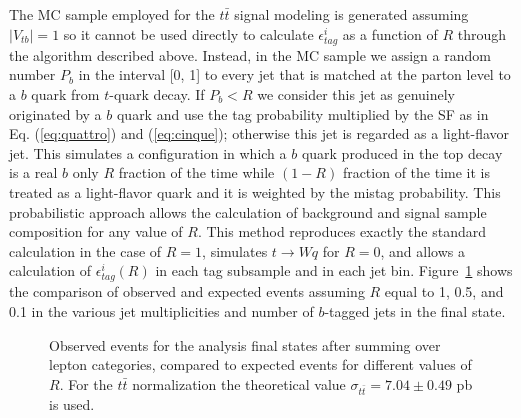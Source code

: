 \documentclass[aps,prd,twocolumn,superscriptaddress,showpacs]{revtex4}
\begin{document}
The MC sample employed for the $t\bar{t}$ signal modeling is generated assuming
 $\left|V_{tb}\right| = 1$ so it cannot be used 
directly to calculate  $\epsilon^{i}_{tag}$ as a function of $R$ through the 
algorithm described above. 
Instead, in the MC sample we assign 
a random number $P_{b}$ in the interval [0, 1] to every jet that is matched at the parton level to a $b$ quark 
from $t$-quark decay.
If $P_{b} <R$ we consider this jet as genuinely originated by a $b$ quark and use the tag probability multiplied by the SF as in
Eq. (\ref{eq:quattro}) and  (\ref{eq:cinque}); otherwise this jet is regarded as a light-flavor 
jet.
This simulates a configuration in which a $b$ quark produced in the top 
decay is a real $b$ only $R$ fraction of the time while  $(1-R)$ fraction of the time it is treated as a 
light-flavor quark and it is weighted by the mistag probability. This probabilistic approach allows the 
calculation of background and signal sample composition for any value of $R$.
This method
 reproduces exactly the standard calculation in the case of $R=1$, 
simulates $t\rightarrow Wq$ for $R=0$, and allows a calculation of 
$\epsilon^i_{tag}(R)$ 
in each tag subsample and in each jet bin.  
Figure~\ref{fig:multipli} shows the comparison of observed and expected events assuming $R$ equal to 1, 
0.5, and 0.1 in the various jet multiplicities and number of $b$-tagged jets in the final state.


\begin{figure}
\begin{center}
\caption{Observed events for the analysis final states after summing over lepton categories, 
compared to expected events for different values
of $R$. For the $t\bar{t}$ normalization the theoretical value  
 $\sigma_{t\bar{t}}=7.04\pm0.49$ pb is used.}
\label{fig:multipli}
\end{center}
\end{figure}
\end{document}
